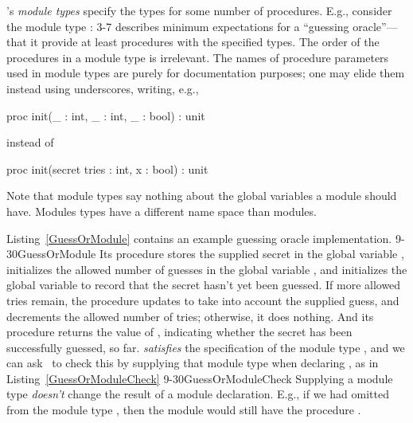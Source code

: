 \EasyCrypt's \emph{module types} specify the types for some number of
procedures.  E.g., consider the module type  :
 {3-7}{}
 describes minimum expectations
for a ``guessing oracle''---that it provide at least procedures with
the specified types.  The order of the procedures in a module type is
irrelevant.  The names of procedure parameters used in module types
are purely for documentation purposes; one may elide them instead
using underscores, writing, e.g.,
\begin{easycrypt}{}{}
proc init(_ : int, _ : int, _ : bool) : unit
\end{easycrypt}
instead of
\begin{easycrypt}{}{}
proc init(secret tries : int, x : bool) : unit
\end{easycrypt}
Note that module types say nothing about the global variables a module
should have. Modules types have a different name space than modules.

Listing~\ref{GuessOrModule} contains an example guessing oracle
implementation.   {9-30}{GuessOrModule} Its  procedure stores
the supplied secret in the global variable , initializes the
allowed number of guesses in the global variable , and
initializes the  global variable to record that the secret
hasn't yet been guessed.  If more allowed tries remain, the 
procedure updates  to take into account the supplied
guess, and decrements the allowed number of tries; otherwise, it does
nothing.  And its  procedure returns the value of
, indicating whether the secret has been successfully
guessed, so far.  \emph{satisfies} the specification of the
module type , and we can ask \EasyCrypt\ to check this by
supplying that module type when declaring , as in
Listing~\ref{GuessOrModuleCheck}
 {9-30}{GuessOrModuleCheck} Supplying a module
type \emph{doesn't} change the result of a module declaration. E.g.,
if we had omitted  from the module type , then the
module  would still have the procedure .

